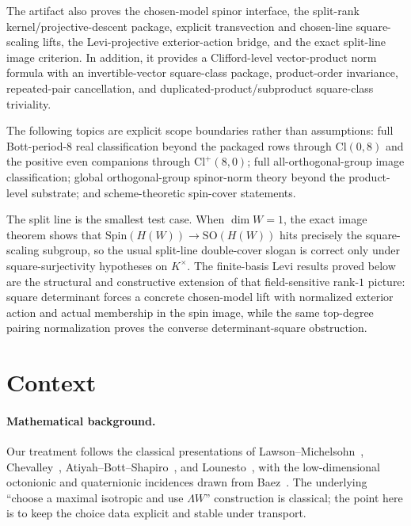 \documentclass{birkjour}
\theoremstyle{plain}
\theoremstyle{definition}
\theoremstyle{remark}
\newcommand{\Cl}{\mathrm{Cl}}
\newcommand{\Spin}{\mathrm{Spin}}
\newcommand{\SO}{\mathrm{SO}}
\newcommand{\wedgeW}{\Lambda W}
\begin{document}
The artifact also proves the chosen-model spinor interface, the split-rank
kernel/projective-descent package, explicit transvection and chosen-line
square-scaling lifts, the Levi-projective exterior-action bridge, and the exact
split-line image criterion. In addition, it provides a Clifford-level
vector-product norm formula with an invertible-vector square-class package,
product-order invariance, repeated-pair cancellation, and
duplicated-product/subproduct square-class triviality.

The following topics are explicit scope boundaries rather than assumptions:
full Bott-period-$8$ real classification beyond the packaged rows through
$\Cl(0,8)$ and the positive even companions through $\Cl^+(8,0)$; full
all-orthogonal-group image classification; global orthogonal-group spinor-norm
theory beyond the product-level substrate; and scheme-theoretic spin-cover
statements.

The split line is the smallest test case. When $\dim W=1$, the exact image
theorem shows that $\Spin(H(W)) \to \SO(H(W))$ hits precisely the
square-scaling subgroup, so the usual split-line double-cover slogan is correct
only under square-surjectivity hypotheses on $K^\times$. The finite-basis Levi
results proved below are the structural and constructive extension of that
field-sensitive rank-$1$ picture: square determinant forces a concrete
chosen-model lift with normalized exterior action and actual membership in the
spin image, while the same top-degree pairing normalization proves the converse
determinant-square obstruction.

\section{Context}
\label{sec:related}

\paragraph{Mathematical background.} Our treatment follows the classical
presentations of Lawson--Michelsohn~\cite{LawsonMichelsohn1989},
Chevalley~\cite{Chevalley1996}, Atiyah--Bott--Shapiro~\cite{AtiyahBottShapiro1964},
and Lounesto~\cite{Lounesto2001}, with the low-dimensional octonionic and
quaternionic incidences drawn from Baez~\cite{Baez2002}. The underlying
``choose a maximal isotropic and use $\wedgeW$'' construction is classical;
the point here is to keep the choice data explicit and stable under transport.
\end{document}
